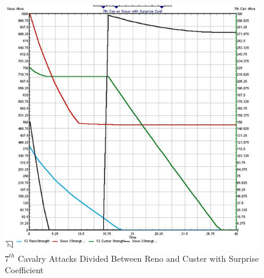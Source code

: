 \documentclass[letterpaper,10pt]{article}
\begin{document}
\begin{figure}[h!tp]
\begin{center}
\includegraphics[scale=0.4]{fig6b.png}
\caption{$7^{th}$ Cavalry Attacks Divided Between Reno and Custer with Surprise Coefficient}
\label{fig6b}
\end{center}
\end{figure}
\end{document}
